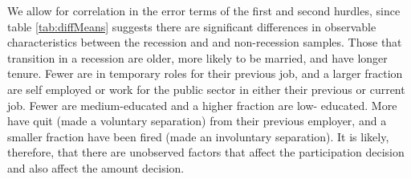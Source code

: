 \documentclass[12pt,authoryear]{elsarticle}
\begin{document}
\vspace{2mm}

We allow for correlation in the error terms of the first and second hurdles, since table \ref{tab:diffMeans} suggests there are significant differences in observable characteristics between the recession and and non-recession samples. Those that transition in a recession are older, more likely to be married, and have longer tenure. Fewer are in temporary roles for their previous job, and a larger fraction are self employed or work for the public sector in either their previous or current job. Fewer are medium-educated and a higher fraction are low- educated. More have quit (made a voluntary separation) from their previous employer, and a smaller fraction have been fired (made an involuntary separation).  It is likely, therefore, that there are unobserved factors that affect the participation decision and also affect the amount decision.






\vspace{2mm}
\end{document}
